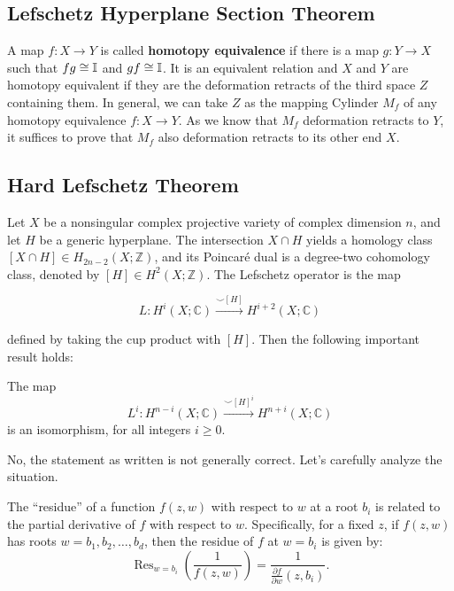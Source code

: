 \documentclass[lang=en,12pt,twoside]{textbook}
\DeclareMathOperator*{\res}{Res} %
\begin{document}
\subsection{Lefschetz Hyperplane Section Theorem}

A map $f: X\to Y$ is called \textbf{homotopy equivalence} if  there is a map $g: Y\to X$ such that $fg\cong {\mathbb I}$ and $gf\cong {\mathbb I}$. It is an equivalent relation and $X$ and $Y$ are homotopy equivalent if they are the deformation retracts of the third space $Z$ containing them. In general, we can take $Z$ as the mapping Cylinder $M_f$ of any homotopy equivalence $f: X\to Y$. As we know that $M_f$ deformation retracts to $Y$, it suffices to prove that $M_f$ also deformation retracts to its other end $X$.

\subsection{Hard Lefschetz Theorem}

Let $X$ be a nonsingular complex projective variety of complex dimension $n$, and let $H$ be a generic hyperplane. The intersection $X \cap H$ yields a homology class $[X \cap H] \in H_{2 n-2}(X ; \mathbb{Z})$, and its Poincaré dual is a degree-two cohomology class, denoted by $[H] \in H^2(X ; \mathbb{Z})$. The Lefschetz operator is the map

$$
L: H^i(X ; \mathbb{C}) \xrightarrow{\smile[H]} H^{i+2}(X ; \mathbb{C})
$$

defined by taking the cup product with $[H]$. Then the following important result holds:

\begin{theorem}\label{thm:hard-lefschtz}
    The map
$$
L^i: H^{n-i}(X ; \mathbb{C}) \xrightarrow{\smile[H]^i} H^{n+i}(X ; \mathbb{C})
$$
is an isomorphism, for all integers $i \geq 0$.
\end{theorem}






No, the statement as written is not generally correct. Let’s carefully analyze the situation.

The ``residue'' of a function $ f(z,w) $ with respect to $ w $ at a root $ b_i $ is related to the partial derivative of $ f $ with respect to $ w $. Specifically, for a fixed $ z $, if $ f(z,w) $ has roots $ w = b_1, b_2, \dots, b_d $, then the residue of $ f $ at $ w = b_i $ is given by:
$$
\res_{w=b_i} \left( \frac{1}{f(z,w)} \right) = \frac{1}{\frac{\partial f}{\partial w}(z, b_i)}.
$$
\end{document}
